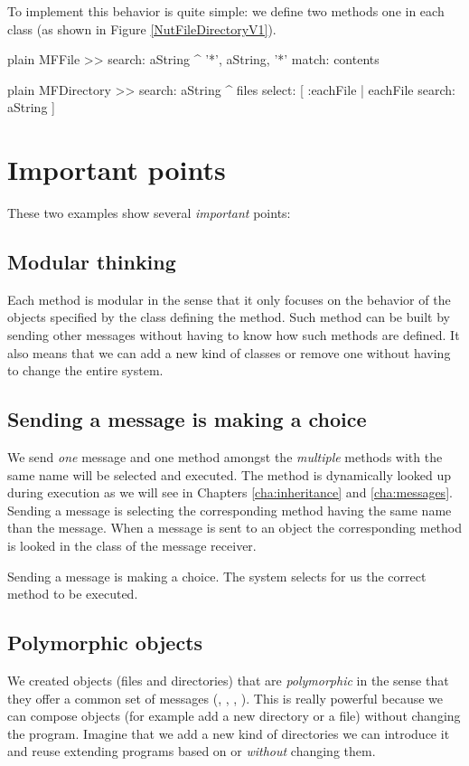 \documentclass[10pt,twoside,english]{_support/latex/sbabook/sbabook}
\begin{document}
To implement this behavior is quite simple: we define two methods one in each class (as shown in Figure \ref{NutFileDirectoryV1}).

\begin{displaycode}{plain}
MFFile >> search: aString
	^ '*', aString, '*' match: contents
\end{displaycode}

\begin{displaycode}{plain}
MFDirectory >> search: aString
	^ files select: [ :eachFile | eachFile search: aString ]
\end{displaycode}
\section{Important points}
These two examples show several \textit{important} points:
\subsection{Modular thinking}
Each method is modular in the sense that it only focuses on the behavior of the objects specified by the class defining the method. Such method can be built by sending other messages without having to know how such methods are defined.
It also means that we can add a new kind of classes or remove one without having to change the entire system.
\subsection{Sending a message is making a choice}
We send \textit{one} message and one method amongst the \textit{multiple} methods with the same name will be selected and executed. The method is dynamically looked up during execution as we will see in Chapters \ref{cha:inheritance} and \ref{cha:messages}. Sending a message is selecting the corresponding method having the same name than the message.  When a message is sent to an object the corresponding method is looked in the class of the message receiver.

\begin{important}
Sending a message is making a choice. The system selects for us the correct method to be executed.
\end{important}
\subsection{Polymorphic objects }
We created objects (files and directories) that are \textit{polymorphic} in the sense that they offer a common set of messages (, , , ). This is really powerful because we can compose objects (for example add a new directory or a file) without changing the program. 
Imagine that we add a new kind of directories we can introduce it and reuse extending programs based on  or  \textit{without} changing them. 
\end{document}
